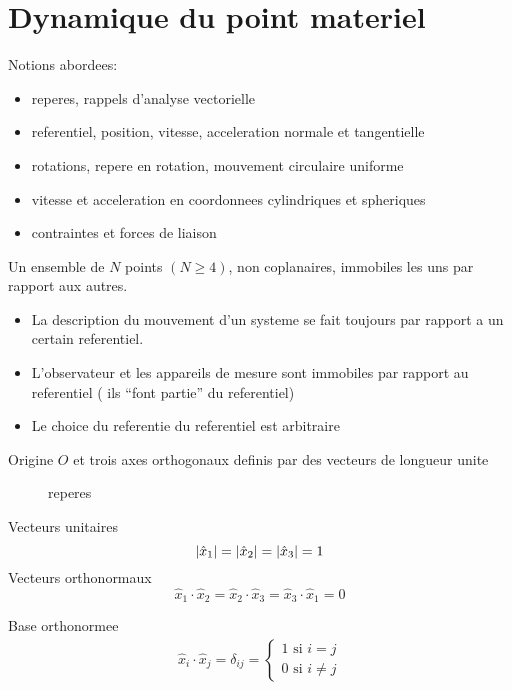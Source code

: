 \documentclass[../main.tex]{subfiles}
\begin{document}
\section{Dynamique du point materiel}

Notions abordees:
\begin{itemize}
\item reperes, rappels d'analyse vectorielle
\item referentiel, position, vitesse, acceleration normale et tangentielle
\item rotations, repere en rotation, mouvement circulaire uniforme
\item vitesse et acceleration en coordonnees cylindriques et spheriques
\item contraintes et forces de liaison
\end{itemize}
\begin{defn}[Referentiel]
	Un ensemble de $N$ points $(N \geq 4)$, non coplanaires, immobiles les uns par rapport aux autres.
\end{defn}
\begin{itemize}
\item La description du mouvement d'un systeme se fait toujours par rapport a un certain referentiel.
\item L'observateur et les appareils de mesure sont immobiles par rapport au referentiel ( ils ``font partie'' du referentiel)
\item Le choice du referentie du referentiel est arbitraire
\end{itemize}

\begin{defn}[Repere]
Origine $O$ et trois axes orthogonaux definis par des vecteurs de longueur unite
\end{defn}
\begin{figure}[ht]
    \centering
    \caption{reperes}
    \label{fig:reperes}
\end{figure}
Vecteurs unitaires
\[ 
	\left\vert\hat{x}_1\right\vert= \left\vert\hat{x}_2\right\vert= \left\vert\hat{x}_3\right\vert = 1
\]
Vecteurs orthonormaux
\[ 
\hat{x}_1 \cdot \hat{x}_2 = \hat{x}_2 \cdot \hat{x}_3 = \hat{x}_3 \cdot \hat{x}_1 = 0
\]

Base orthonormee
\begin{align*}
\hat{x}_i \cdot \hat{x}_j = \delta_{ij} = 
\begin{cases}
1 \text{ si } i =j\\
0 \text{ si } i \neq j
\end{cases}
\end{align*}
\end{document}
